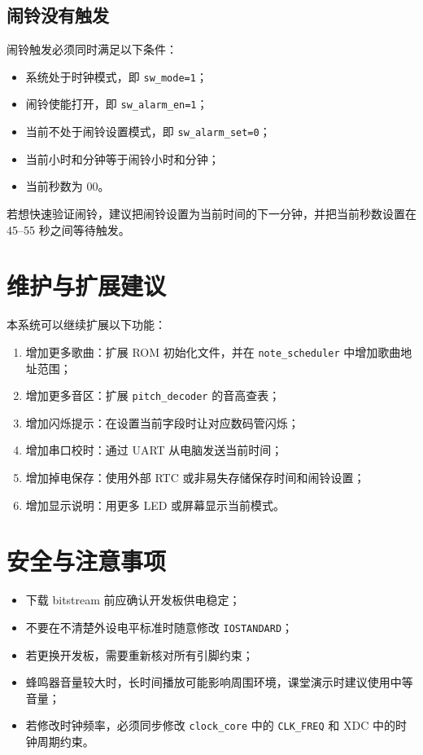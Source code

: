 \documentclass[UTF8,a4paper,12pt]{ctexart}
\newcommand{\port}[1]{\texttt{#1}}
\begin{document}
\subsection{闹铃没有触发}

闹铃触发必须同时满足以下条件：

\begin{itemize}
  \item 系统处于时钟模式，即 \port{sw\_mode=1}；
  \item 闹铃使能打开，即 \port{sw\_alarm\_en=1}；
  \item 当前不处于闹铃设置模式，即 \port{sw\_alarm\_set=0}；
  \item 当前小时和分钟等于闹铃小时和分钟；
  \item 当前秒数为 00。
\end{itemize}

若想快速验证闹铃，建议把闹铃设置为当前时间的下一分钟，并把当前秒数设置在 45--55 秒之间等待触发。

\section{维护与扩展建议}

本系统可以继续扩展以下功能：

\begin{enumerate}
  \item 增加更多歌曲：扩展 ROM 初始化文件，并在 \port{note\_scheduler} 中增加歌曲地址范围；
  \item 增加更多音区：扩展 \port{pitch\_decoder} 的音高查表；
  \item 增加闪烁提示：在设置当前字段时让对应数码管闪烁；
  \item 增加串口校时：通过 UART 从电脑发送当前时间；
  \item 增加掉电保存：使用外部 RTC 或非易失存储保存时间和闹铃设置；
  \item 增加显示说明：用更多 LED 或屏幕显示当前模式。
\end{enumerate}

\section{安全与注意事项}

\begin{itemize}
  \item 下载 bitstream 前应确认开发板供电稳定；
  \item 不要在不清楚外设电平标准时随意修改 \port{IOSTANDARD}；
  \item 若更换开发板，需要重新核对所有引脚约束；
  \item 蜂鸣器音量较大时，长时间播放可能影响周围环境，课堂演示时建议使用中等音量；
  \item 若修改时钟频率，必须同步修改 \port{clock\_core} 中的 \port{CLK\_FREQ} 和 XDC 中的时钟周期约束。
\end{itemize}
\end{document}
